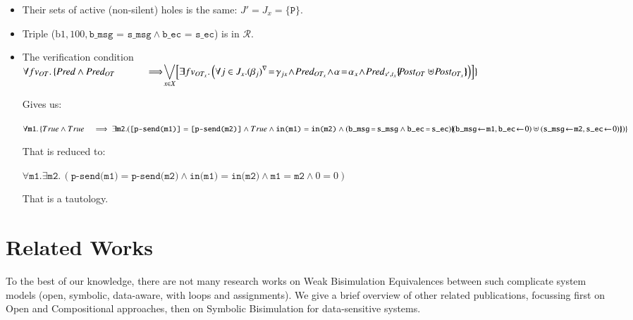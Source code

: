 \documentclass{elsarticle}
\newcommand{\nounderline}[1]{#1}
\begin{document}
\begin{itemize}
  \item Their sets of active (non-silent) holes is the same: $J' = J_x = \{\texttt{P}\}$.
  \item Triple ($\text{b1},  100,  \texttt{b\_msg = s\_msg} \land \texttt{b\_ec = s\_ec}$) is in $\mathcal{R}$.
  \item The verification condition \\
    $\forall fv_{OT}.\, \{ \Pred \land \Pred_{OT}\\
\hspace{1cm} \implies\!\!\! \displaystyle{\bigvee_{x\in X}\!
   \left[\exists fv_{OT_x}.
  \left( \forall j\in J_x. \vis{\beta_j}\!=\!\gamma_{jx}\! \land\! \Pred_{OT_x}
     \!\land\! \alpha\!=\!\alpha_x\! \land\!  
     \Pred_{s',t_x}\subst{\Post_{OT}\uplus\!\Post_{OT_x}}\right)\right]\}}$

\medskip Gives us:

$\forall \texttt{m1}.\, \{True \land True\hspace{3mm} \implies
\exists \texttt{m2}. \\
(\texttt{[p-send(m1)]} = \texttt{[p-send(m2)]}
\land True
\land \nounderline{\texttt{in(m1)}} = \nounderline{\texttt{in(m2)}} \land 
\\
(\texttt{b\_msg\!\! = \!\!s\_msg} \land \texttt{b\_ec\!\! =\!\! s\_ec}) \subst{(\texttt{b\_msg}\!\gets\! \texttt{m1}, \texttt{b\_ec}\!\gets\! 0)\uplus (\texttt{s\_msg}\!\gets\! \texttt{m2},\texttt{s\_ec}\!\gets\! 0)})\}$

\medskip That is reduced to:

$\forall \texttt{m1}. \exists \texttt{m2}.\,
(\texttt{p-send(m1)} = \texttt{p-send(m2)}
\land \texttt{in(m1)} = \texttt{in(m2)}
\land \texttt{m1}=\texttt{m2} \land 0=0)$

\medskip That is a tautology.

\end{itemize}


      
\section{Related Works}\label{sec:RW}

 To the best of our knowledge, there are not many research works on Weak Bisimulation Equivalences between such complicate system models (open, symbolic, data-aware, with loops and assignments).
We give a brief overview of other related publications, focussing first on Open and Compositional approaches, then on Symbolic Bisimulation for data-sensitive systems.
\end{document}
